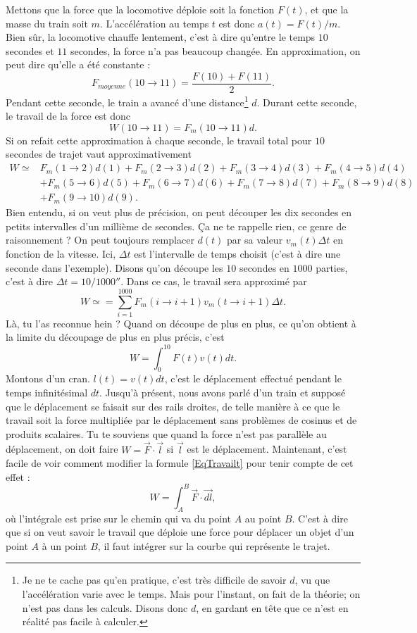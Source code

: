 \documentclass[a4paper,12pt]{book}
\theoremstyle{mes_exemples}	\newtheorem{exemple}[numtho]{Exemple}
\theoremstyle{mes_tho}
\begin{document}
Mettons que la force que la locomotive déploie soit la fonction $F(t)$, et que la masse du train soit $m$. L'accélération au temps $t$ est donc $a(t)=F(t)/m$. Bien sûr, la locomotive chauffe lentement, c'est à dire qu'entre le temps $10$ secondes et $11$ secondes, la force n'a pas beaucoup changée. En approximation, on peut dire qu'elle a été constante :
\[ 
  F_{moyenne}(10\to 11)=\frac{ F(10)+F(11) }{ 2 }.
\]
Pendant cette seconde, le train a avancé d'une distance\footnote{Je ne te cache pas qu'en pratique, c'est très difficile de savoir $d$, vu que l'accélération varie avec le temps. Mais pour l'instant, on fait de la théorie; on n'est pas dans les calculs. Disons donc $d$, en gardant en tête que ce n'est en réalité pas facile à calculer.} $d$. Durant cette seconde, le travail de la force est donc 
\[ 
  W(10\to11)=F_{m}(10\to 11)d.
\]
Si on refait cette approximation à chaque seconde, le travail total pour $10$ secondes de trajet vaut approximativement
\[ 
\begin{split}
  W\simeq&F_{m}(1\to 2)d(1)+F_{m}(2\to 3)d(2)+F_{m}(3\to 4)d(3)+F_{m}(4\to 5)d(4)\\
		&+F_{m}(5\to 6)d(5)+F_{m}(6\to 7)d(6)+F_{m}(7\to 8)d(7)+F_{m}(8\to 9)d(8)\\
		&+F_{m}(9\to 10)d(9).
\end{split}
\]
Bien entendu, si on veut plus de précision, on peut découper les dix secondes en petits intervalles d'un millième de secondes. Ça ne te rappelle rien, ce genre de raisonnement ? On peut toujours remplacer $d(t)$ par sa valeur $v_m(t)\Delta t$ en fonction de la vitesse. Ici, $\Delta t$ est l'intervalle de temps choisit (c'est à dire une seconde dans l'exemple). Disons qu'on découpe les $10$ secondes en $1000$ parties, c'est à dire $\Delta t=\unit{10/1000}{\second}$. Dans ce cas, le travail sera approximé par
\[ 
  W\simeq=\sum_{i=1}^{1000}F_m(i\to i+1)v_m(t\to i+1)\Delta t.
\]
Là, tu l'as reconnue hein ? Quand on découpe de plus en plus, ce qu'on obtient à la limite du découpage de plus en plus précis, c'est
\begin{equation}	\label{EqTravailt}
W=\int_0^{10} F(t)v(t)dt.
\end{equation}
Montons d'un cran. $l(t)=v(t)dt$, c'est le déplacement effectué pendant le temps \og infinitésimal\fg{} $dt$. Jusqu'à présent, nous avons parlé d'un train et supposé que le déplacement se faisait sur des rails droites, de telle manière à ce que le travail soit la force multipliée par le déplacement sans problèmes de cosinus et de produits scalaires. Tu te souviens que quand la force n'est pas parallèle au déplacement, on doit faire $W=\overrightarrow{ F }\cdot\overrightarrow{ l }$ si $\overrightarrow{ l }$ est le déplacement. Maintenant, c'est facile de voir comment modifier la formule \eqref{EqTravailt} pour tenir compte de cet effet :
\begin{equation}
	W=\int_A^B \overrightarrow{ F }\cdot \overrightarrow{ dl },
\end{equation}
où l'intégrale est prise sur le chemin qui va du point $A$ au point $B$. C'est à dire que si on veut savoir le travail que déploie une force pour déplacer un objet d'un point $A$ à un point $B$, il faut intégrer sur la courbe qui représente le trajet.
\end{document}
